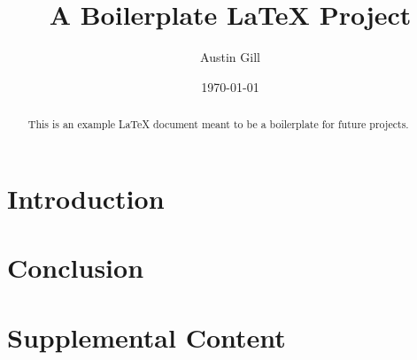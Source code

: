\documentclass{article}
\title{A Boilerplate \LaTeX{} Project}
\author{Austin Gill}
\date{\today}
\begin{document}
    \maketitle
    \begin{abstract}
        This is an example \LaTeX{} document meant to be a boilerplate for future projects.
    \end{abstract}
    \thispagestyle{empty}

    \newpage
    \tableofcontents

    \newpage
    \section{Introduction}\label{sec:introduction}
        

    \section{Conclusion}\label{sec:conclusion}
        

    \newpage
    \appendix\appendixpage{}\addappheadtotoc{}
    \section{Supplemental Content}\label{sec:supplemental-content}

    \newpage
    
    
\end{document}
